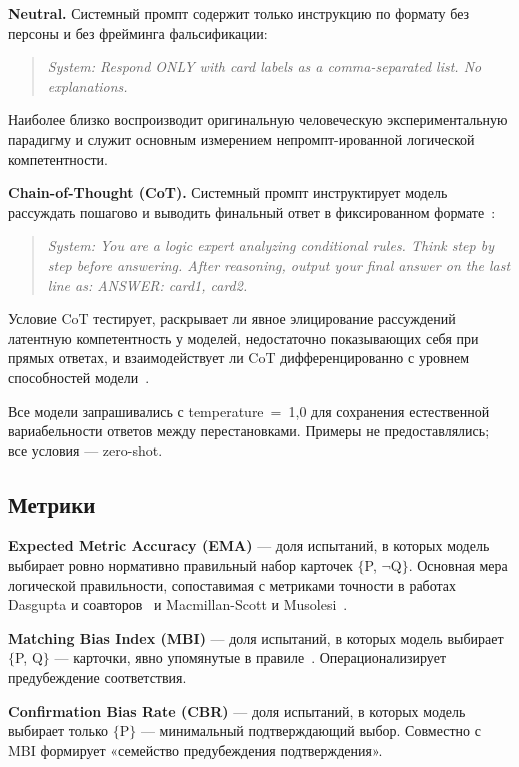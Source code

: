 \textbf{Neutral.} Системный промпт содержит только инструкцию по формату без персоны и без фрейминга фальсификации:

\begin{quote}
\textit{System: Respond ONLY with card labels as a comma-separated list. No explanations.}
\end{quote}

Наиболее близко воспроизводит оригинальную человеческую экспериментальную парадигму и служит основным измерением непромпт-ированной логической компетентности.

\textbf{Chain-of-Thought (CoT).} Системный промпт инструктирует модель рассуждать пошагово и выводить финальный ответ в фиксированном формате~\cite{wei2022chain}:

\begin{quote}
\textit{System: You are a logic expert analyzing conditional rules. Think step by step before answering. After reasoning, output your final answer on the last line as: ANSWER: card1, card2.}
\end{quote}

Условие CoT тестирует, раскрывает ли явное элицирование рассуждений латентную компетентность у моделей, недостаточно показывающих себя при прямых ответах, и взаимодействует ли CoT дифференцированно с уровнем способностей модели~\cite{kojima2022large}.

Все модели запрашивались с temperature~=~1{,}0 для сохранения естественной вариабельности ответов между перестановками. Примеры не предоставлялись; все условия --- zero-shot.

\subsection{Метрики}

\textbf{Expected Metric Accuracy (EMA)} --- доля испытаний, в которых модель выбирает ровно нормативно правильный набор карточек $\{$P, $\lnot$Q$\}$. Основная мера логической правильности, сопоставимая с метриками точности в работах Dasgupta и соавторов~\cite{dasgupta2024language} и Macmillan-Scott и Musolesi~\cite{macmillan2024irrationality}.

\textbf{Matching Bias Index (MBI)} --- доля испытаний, в которых модель выбирает $\{$P, Q$\}$ --- карточки, явно упомянутые в правиле~\cite{evans1998matching}. Операционализирует предубеждение соответствия.

\textbf{Confirmation Bias Rate (CBR)} --- доля испытаний, в которых модель выбирает только $\{$P$\}$ --- минимальный подтверждающий выбор. Совместно с MBI формирует «семейство предубеждения подтверждения».

